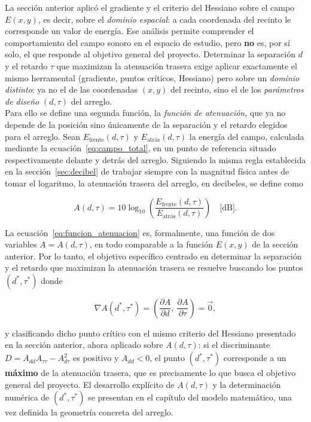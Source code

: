 \noindent La sección anterior aplicó el gradiente y el criterio del Hessiano
sobre el campo \(E(x,y)\), es decir, sobre el \emph{dominio espacial}: a
cada coordenada del recinto le corresponde un valor de energía. Ese
análisis permite comprender el comportamiento del campo sonoro en el
espacio de estudio, pero \textbf{no} es, por sí solo, el que responde
al objetivo general del proyecto. Determinar la separación \(d\) y el
retardo \(\tau\) que maximizan la atenuación trasera exige aplicar
exactamente el mismo herramental (gradiente, puntos críticos, Hessiano)
pero sobre un \emph{dominio distinto}: ya no el de las coordenadas \((x,y)\)
del recinto, sino el de los \emph{parámetros de diseño} \((d,\tau)\) del arreglo.\\

\noindent Para ello se define una segunda función, la \emph{función de
atenuación}, que ya no depende de la posición sino únicamente de la
separación y el retardo elegidos para el arreglo. Sean
\(E_{\text{frente}}(d,\tau)\) y \(E_{\text{atrás}}(d,\tau)\) la energía del
campo, calculada mediante la ecuación~\eqref{eq:campo_total}, en un
punto de referencia situado respectivamente delante y detrás del
arreglo. Siguiendo la misma regla establecida en la
sección~\ref{sec:decibel} de trabajar siempre con la magnitud física
antes de tomar el logaritmo, la atenuación trasera del arreglo, en
decibeles, se define como

\begin{equation}
A(d,\tau) = 10\log_{10}\!\left(\frac{E_{\text{frente}}(d,\tau)}
{E_{\text{atrás}}(d,\tau)}\right) \quad \text{[dB]}.
\label{eq:funcion_atenuacion}
\end{equation}

\noindent La ecuación~\eqref{eq:funcion_atenuacion} es, formalmente, una función
de dos variables \(A=A(d,\tau)\), en todo comparable a la función
\(E(x,y)\) de la sección anterior. Por lo tanto, el objetivo específico
centrado en determinar la separación y el retardo que maximizan la
atenuación trasera se resuelve buscando los puntos \((d^\ast,\tau^\ast)\) donde

\begin{equation}
\nabla A(d^\ast,\tau^\ast) =
\left(\frac{\partial A}{\partial d},\ \frac{\partial A}{\partial \tau}\right)
= \vec{0},
\end{equation}

\noindent y clasificando dicho punto crítico con el mismo criterio del Hessiano
presentado en la sección anterior, ahora aplicado sobre
\(A(d,\tau)\): si el discriminante
\(D=A_{dd}A_{\tau\tau}-A_{d\tau}^2\) es positivo y \(A_{dd}<0\), el punto
\((d^\ast,\tau^\ast)\) corresponde a un \textbf{máximo} de la atenuación
trasera, que es precisamente lo que busca el objetivo general del
proyecto. El desarrollo explícito de \(A(d,\tau)\) y la determinación
numérica de \((d^\ast,\tau^\ast)\) se presentan en el capítulo del
modelo matemático, una vez definida la geometría concreta del arreglo.\\

